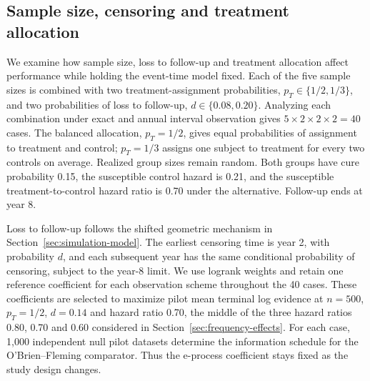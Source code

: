 \documentclass[12pt]{article}
\theoremstyle{definition}
\theoremstyle{remark}
\begin{document}
\subsection{Sample size, censoring and treatment allocation}
\label{sec:design-sensitivity}
We examine how sample size, loss to follow-up and treatment allocation affect performance while holding the event-time model fixed. Each of the five sample sizes is combined with two treatment-assignment probabilities, $p_T\in\{1/2,1/3\}$, and two probabilities of loss to follow-up, $d\in\{0.08,0.20\}$. Analyzing each combination under exact and annual interval observation gives $5\times2\times2\times2=40$ cases. The balanced allocation, $p_T=1/2$, gives equal probabilities of assignment to treatment and control; $p_T=1/3$ assigns one subject to treatment for every two controls on average. Realized group sizes remain random. Both groups have cure probability 0.15, the susceptible control hazard is 0.21, and the susceptible treatment-to-control hazard ratio is 0.70 under the alternative. Follow-up ends at year 8.

Loss to follow-up follows the shifted geometric mechanism in Section~\ref{sec:simulation-model}. The earliest censoring time is year 2, with probability $d$, and each subsequent year has the same conditional probability of censoring, subject to the year-8 limit. We use logrank weights and retain one reference coefficient for each observation scheme throughout the 40 cases. These coefficients are selected to maximize pilot mean terminal log evidence at $n=500$, $p_T=1/2$, $d=0.14$ and hazard ratio 0.70, the middle of the three hazard ratios 0.80, 0.70 and 0.60 considered in Section~\ref{sec:frequency-effects}. For each case, 1,000 independent null pilot datasets determine the information schedule for the O'Brien--Fleming comparator. Thus the e-process coefficient stays fixed as the study design changes.
\end{document}
